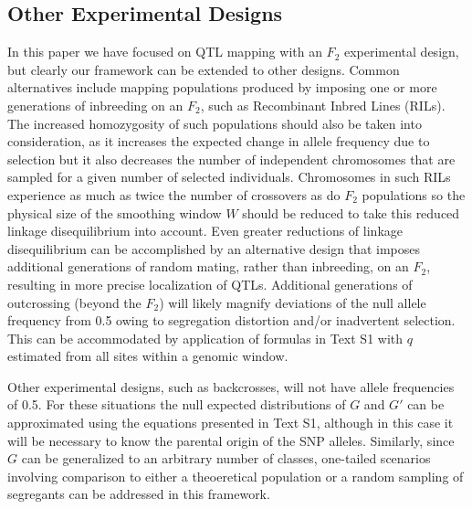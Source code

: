 \subsection{Other Experimental Designs}

In this paper we have focused on QTL mapping with an $F_2$ experimental design, but clearly our framework can be extended to  other designs.   Common alternatives include mapping populations produced by imposing one or more generations of inbreeding on an $F_2$, such as Recombinant Inbred Lines (RILs). The increased homozygosity of such populations should also be taken into consideration, as it increases the expected change in allele frequency due to selection but it also decreases the number of independent chromosomes that are sampled for a given number of selected individuals.  Chromosomes in such RILs experience as much as twice the number of crossovers as do $F_2$ populations so the physical size of the smoothing window $W$ should be reduced to take this reduced linkage disequilibrium into account. Even greater reductions of linkage disequilibrium can be accomplished by an alternative design that imposes additional generations of random mating, rather than inbreeding, on an $F_2$, resulting in more precise localization of QTLs.  Additional generations of outcrossing (beyond the $F_2$) will likely magnify deviations of the null allele frequency from 0.5 owing to segregation distortion and/or inadvertent selection.  This can be accommodated by application of formulas in Text S1 with $q$ estimated from all sites within a genomic window. 

Other experimental designs, such as backcrosses, will not have allele frequencies of 0.5.  For these situations the null expected distributions of $G$ and $G'$ can be approximated using the equations presented in Text S1, although in this case it will be necessary to know the parental origin of the SNP alleles.  Similarly, since $G$ can be generalized to an arbitrary number of classes, one-tailed scenarios involving comparison to either a theoeretical population or a random sampling of segregants can be addressed in this framework. 

    
